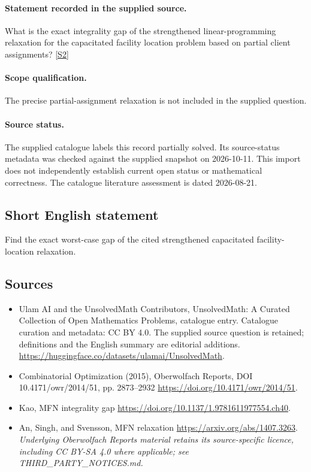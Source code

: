 \documentclass[11pt]{article}
\begin{document}
\paragraph{Statement recorded in the supplied source.}
What is the exact integrality gap of the strengthened linear-programming relaxation for the capacitated facility location problem based on partial client assignments? \href{https://doi.org/10.4171/owr/2014/51}{[S2]}
\paragraph{Scope qualification.}
The precise partial-assignment relaxation is not included in the supplied question.
\paragraph{Source status.}
The supplied catalogue labels this record partially solved. Its source-status metadata was checked against the supplied snapshot on 2026-10-11. This import does not independently establish current open status or mathematical correctness. The catalogue literature assessment is dated 2026-08-21.
\subsection{Short English statement}
Find the exact worst-case gap of the cited strengthened capacitated facility-location relaxation.
\subsection{Sources}
\begin{itemize}
\item[S1] Ulam AI and the UnsolvedMath Contributors, UnsolvedMath: A Curated Collection of Open Mathematics Problems, catalogue entry. Catalogue curation and metadata: CC BY 4.0. The supplied source question is retained; definitions and the English summary are editorial additions.
\url{https://huggingface.co/datasets/ulamai/UnsolvedMath}.
\item[S2] Combinatorial Optimization (2015), Oberwolfach Reports, DOI 10.4171/owr/2014/51, pp. 2873--2932
\url{https://doi.org/10.4171/owr/2014/51}.
\item[S3] Kao, MFN integrality gap
\url{https://doi.org/10.1137/1.9781611977554.ch40}.
\item[S4] An, Singh, and Svensson, MFN relaxation
\url{https://arxiv.org/abs/1407.3263}.
\textit{Underlying Oberwolfach Reports material retains its source-specific licence, including CC BY-SA 4.0 where applicable; see THIRD\_PARTY\_NOTICES.md.}
\end{itemize}
\end{document}
